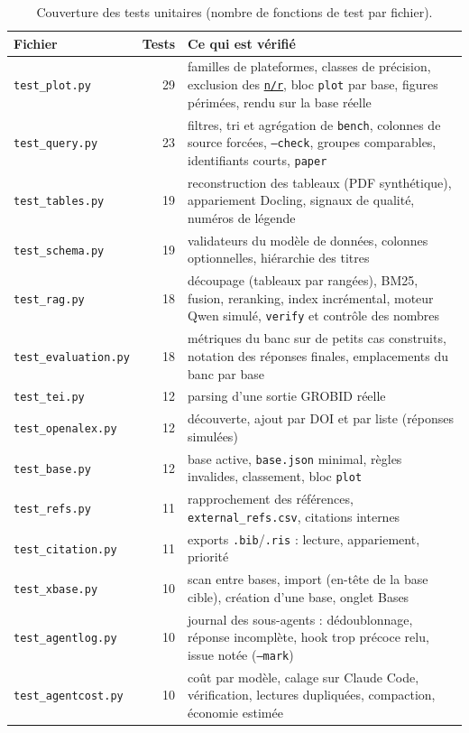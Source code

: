 \documentclass[11pt,a4paper]{article}
\newcommand{\cmd}[1]{\texttt{#1}}
\newcommand{\gl}[2]{\hyperlink{gl:#1}{\textcolor{glcolor}{#2}}}
\newcommand{\nr}{\gl{nr}{\texttt{n/r}}}
\begin{document}
\begin{table}[ht]
\centering
\caption{Couverture des tests unitaires (nombre de fonctions de test par fichier).}
\label{tab:tests}
\small
\begin{tabularx}{\linewidth}{@{}lrL@{}}
\toprule
Fichier & Tests & Ce qui est vérifié \\
\midrule
\cmd{test\_plot.py} & 29 & familles de plateformes, classes de précision, exclusion des \nr{}, bloc \cmd{plot} par base, figures périmées, rendu sur la base réelle \\
\cmd{test\_query.py} & 23 & filtres, tri et agrégation de \cmd{bench}, colonnes de source forcées, \cmd{--check}, groupes comparables, identifiants courts, \cmd{paper} \\
\cmd{test\_tables.py} & 19 & reconstruction des tableaux (PDF synthétique), appariement Docling, signaux de qualité, numéros de légende \\
\cmd{test\_schema.py} & 19 & validateurs du modèle de données, colonnes optionnelles, hiérarchie des titres \\
\cmd{test\_rag.py} & 18 & découpage (tableaux par rangées), BM25, fusion, reranking, index incrémental, moteur Qwen simulé, \cmd{verify} et contrôle des nombres \\
\cmd{test\_evaluation.py} & 18 & métriques du banc sur de petits cas construits, notation des réponses finales, emplacements du banc par base \\
\cmd{test\_tei.py} & 12 & parsing d'une sortie GROBID réelle \\
\cmd{test\_openalex.py} & 12 & découverte, ajout par DOI et par liste (réponses simulées) \\
\cmd{test\_base.py} & 12 & base active, \cmd{base.json} minimal, règles invalides, classement, bloc \cmd{plot} \\
\cmd{test\_refs.py} & 11 & rapprochement des références, \cmd{external\_refs.csv}, citations internes \\
\cmd{test\_citation.py} & 11 & exports \cmd{.bib}/\cmd{.ris} : lecture, appariement, priorité \\
\cmd{test\_xbase.py} & 10 & scan entre bases, import (en-tête de la base cible), création d'une base, onglet Bases \\
\cmd{test\_agentlog.py} & 10 & journal des sous-agents : dédoublonnage, réponse incomplète, hook trop précoce relu, issue notée (\cmd{--mark}) \\
\cmd{test\_agentcost.py} & 10 & coût par modèle, calage sur Claude Code, vérification, lectures dupliquées, compaction, économie estimée \\

\end{tabularx}
\end{table}
\end{document}
